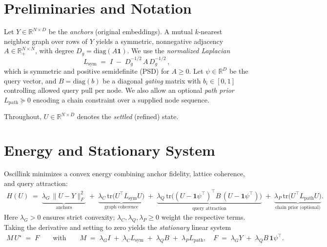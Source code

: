 \documentclass[11pt]{article}
\begin{document}
\vspace{-0.5em}
\section{Preliminaries and Notation}
Let $Y\in\mathbb{R}^{N\times D}$ be the \emph{anchors} (original embeddings). A mutual $k$-nearest neighbor graph over rows of $Y$ yields a symmetric, nonnegative adjacency $A\in\mathbb{R}_+^{N\times N}$, with degree $D_g = \mathrm{diag}(A\mathbf{1})$. We use the \emph{normalized Laplacian}
\[
  L_{\mathrm{sym}} \;=\; I \;-\; D_g^{-1/2} \, A \, D_g^{-1/2}\,,
\]
which is symmetric and positive semidefinite (PSD) for $A\!\ge 0$. Let $\psi\in\mathbb{R}^{D}$ be the query vector, and $B=\mathrm{diag}(b)$ be a diagonal \emph{gating} matrix with $b_i\!\in[0,1]$ controlling allowed query pull per node. We also allow an optional \emph{path prior} $L_{\mathrm{path}}\succeq 0$ encoding a chain constraint over a supplied node sequence.

Throughout, $U\in\mathbb{R}^{N\times D}$ denotes the \emph{settled} (refined) state.

\vspace{-0.5em}
\section{Energy and Stationary System}
Oscillink minimizes a convex energy combining anchor fidelity, lattice coherence, and query attraction:
\begin{align}
\label{eq:energy}
H(U) \;=\; 
\underbrace{\lambda_G \, \|U - Y\|_F^2}_{\text{anchors}}
\;+\;
\underbrace{\lambda_C \, \mathrm{tr}\!\big(U^\top L_{\mathrm{sym}} U\big)}_{\text{graph coherence}}
\;+\;
\underbrace{\lambda_Q \, \mathrm{tr}\!\big((U-\mathbf{1}\psi^\top)^\top B \, (U-\mathbf{1}\psi^\top)\big)}_{\text{query attraction}}
\;+\;
\underbrace{\lambda_P \, \mathrm{tr}\!\big(U^\top L_{\mathrm{path}} U\big)}_{\text{chain prior (optional)}}.
\end{align}
Here $\lambda_G>0$ ensures strict convexity; $\lambda_C,\lambda_Q,\lambda_P\ge 0$ weight the respective terms. Taking the derivative and setting to zero yields the \emph{stationary} linear system
\begin{align}
\label{eq:stationary}
M \, U^\star \;=\; F
\qquad\text{with}\qquad
M \;=\; \lambda_G I \;+\; \lambda_C L_{\mathrm{sym}} \;+\; \lambda_Q B \;+\; \lambda_P L_{\mathrm{path}},
\quad
F \;=\; \lambda_G Y \;+\; \lambda_Q B \,\mathbf{1}\psi^\top.
\end{align}
\end{document}
